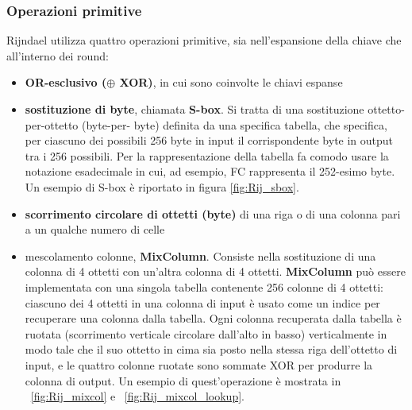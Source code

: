 \subsubsection{Operazioni primitive}
Rijndael utilizza quattro operazioni primitive, sia nell'espansione della chiave che all'interno dei round:
\begin{itemize}
  \item \textbf{OR-esclusivo ($\oplus$ XOR)}, in cui sono coinvolte le chiavi espanse
  \item \textbf{sostituzione di byte}, chiamata \textbf{S-box}. Si tratta di una sostituzione ottetto-per-ottetto (byte-per- byte) definita da una specifica tabella, che specifica, per ciascuno dei possibili 256 byte in input il corrispondente byte in output tra i 256 possibili. Per la rappresentazione della tabella fa comodo usare la notazione esadecimale in cui, ad esempio, FC rappresenta il 252-esimo byte. Un esempio di S-box è riportato in figura \ref{fig:Rij_sbox}.
  \item \textbf{scorrimento circolare di ottetti (byte)} di una riga o di una colonna pari a un qualche numero di celle
  \item mescolamento colonne, \textbf{MixColumn}. Consiste nella sostituzione di una colonna di 4 ottetti con un'altra colonna di 4 ottetti. \textbf{MixColumn} può essere implementata con una singola tabella contenente 256 colonne di 4 ottetti: ciascuno dei 4 ottetti in una colonna di input è usato come un indice per recuperare una colonna dalla tabella. Ogni colonna recuperata dalla tabella è ruotata (scorrimento verticale circolare dall'alto in basso) verticalmente in modo tale che il suo ottetto in cima sia posto nella stessa riga dell'ottetto di input, e le quattro colonne ruotate sono sommate XOR per produrre la colonna di output. Un esempio di quest'operazione è mostrata in \figurename ~\ref{fig:Rij_mixcol} e \figurename ~\ref{fig:Rij_mixcol_lookup}.
\end{itemize}


